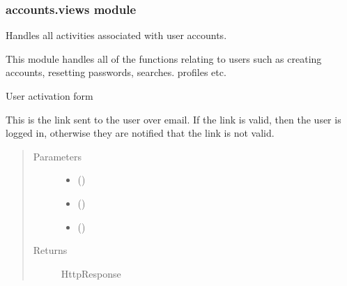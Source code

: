 \documentclass[letterpaper,10pt,english]{sphinxmanual}
\begin{document}
\subsubsection{accounts.views module}
\label{\detokenize{accounts:module-accounts.views}}\label{\detokenize{accounts:accounts-views-module}}
Handles all activities associated with user accounts.

This module handles all of the functions relating to users such as creating
accounts, resetting passwords, searches. profiles etc.

\begin{fulllineitems}
\label{\detokenize{accounts:accounts.views.activate}}
User activation form

This is the link sent to the user over email. If the link is valid, then
the user is logged in, otherwise they are notified that the link is not
valid.
\begin{quote}\begin{description}
\item[{Parameters}] \leavevmode\begin{itemize}
\item {} 
 () \textendash{} 

\item {} 
 () \textendash{} 

\item {} 
 () \textendash{} 

\end{itemize}

\item[{Returns}] \leavevmode
HttpResponse

\end{description}\end{quote}

\end{fulllineitems}
\end{document}
